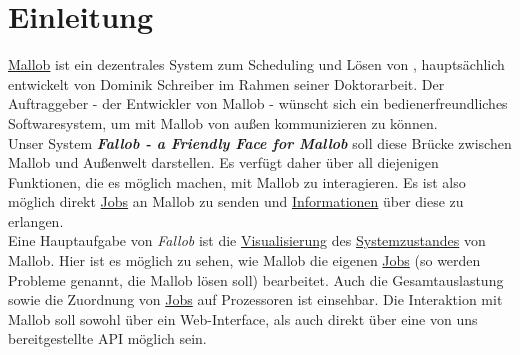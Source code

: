 \section{Einleitung}



\href{https://github.com/domschrei/mallob}{Mallob} ist ein dezentrales System zum Scheduling und Lösen von , hauptsächlich entwickelt von Dominik Schreiber im Rahmen seiner Doktorarbeit. Der Auftraggeber - der Entwickler von Mallob - wünscht sich ein bedienerfreundliches Softwaresystem, um mit Mallob von außen kommunizieren zu können. \\
Unser System \textbf{\textit{Fallob - a Friendly Face for Mallob}} soll diese Brücke zwischen Mallob und Außenwelt darstellen.
Es verfügt daher über all diejenigen Funktionen, die es möglich machen, mit Mallob zu interagieren. Es ist also möglich direkt \hyperref[B:Jobs]{Jobs} an Mallob zu senden und \hyperref[B:Job-Informationen]{Informationen} über diese zu erlangen.\\
Eine Hauptaufgabe von \textit{Fallob} ist die \hyperref[pages:visualization]{Visualisierung} des \hyperref[B:Systemzustand]{Systemzustandes} von Mallob. Hier ist es möglich zu sehen, wie Mallob die eigenen \hyperref[B:Jobs]{Jobs} (so werden Probleme genannt, die Mallob lösen soll) bearbeitet. Auch die Gesamtauslastung sowie die Zuordnung von \hyperref[B:Jobs]{Jobs} auf Prozessoren ist einsehbar. 
Die Interaktion mit Mallob soll sowohl über ein \gls{Web-Interface}, als auch direkt über eine von uns bereitgestellte \gls{API} möglich sein. %




